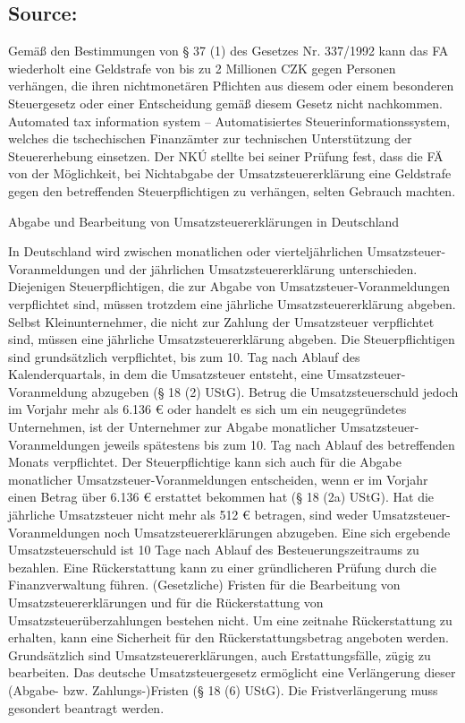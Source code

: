 \documentclass[10pt]{article}
\begin{document}
\subsection*{Source:}

Gemäß den Bestimmungen von § 37 (1) des Gesetzes Nr. 337/1992 kann das FA wiederholt eine Geldstrafe von bis zu 2 Millionen CZK gegen Personen verhängen, die ihren nichtmonetären Pﬂichten aus diesem oder einem besonderen Steuergesetz oder einer Entscheidung gemäß diesem Gesetz nicht nachkommen.
Automated tax information system – Automatisiertes Steuerinformationssystem, welches die tschechischen Finanzämter zur technischen Unterstützung der Steuererhebung einsetzen.
Der NKÚ stellte bei seiner Prüfung fest, dass die FÄ von der Möglichkeit, bei Nichtabgabe der Umsatzsteuererklärung eine Geldstrafe gegen den betreffenden Steuerpﬂichtigen zu verhängen, selten Gebrauch machten.


Abgabe und Bearbeitung von Umsatzsteuererklärungen in Deutschland

In Deutschland wird zwischen monatlichen oder vierteljährlichen Umsatzsteuer-Voranmeldungen und der jährlichen Umsatzsteuererklärung unterschieden.
Diejenigen Steuerpﬂichtigen, die zur Abgabe von Umsatzsteuer-Voranmeldungen verpﬂichtet sind, müssen trotzdem eine jährliche Umsatzsteuererklärung abgeben.
Selbst Kleinunternehmer, die nicht zur Zahlung der Umsatzsteuer verpﬂichtet sind, müssen eine jährliche Umsatzsteuererklärung abgeben.
Die Steuerpﬂichtigen sind grundsätzlich verpﬂichtet, bis zum 10. Tag nach Ablauf des Kalenderquartals, in dem die Umsatzsteuer entsteht, eine Umsatzsteuer-Voranmeldung abzugeben (§ 18 (2) UStG).
Betrug die Umsatzsteuerschuld jedoch im Vorjahr mehr als 6.136 € oder handelt es sich um ein neugegründetes Unternehmen, ist der Unternehmer zur Abgabe monatlicher Umsatzsteuer-Voranmeldungen jeweils spätestens bis zum 10. Tag nach Ablauf des betreffenden Monats verpﬂichtet.
Der Steuerpﬂichtige kann sich auch für die Abgabe monatlicher Umsatzsteuer-Voranmeldungen entscheiden, wenn er im Vorjahr einen Betrag über 6.136 € erstattet bekommen hat (§ 18 (2a) UStG).
Hat die jährliche Umsatzsteuer nicht mehr als 512 € betragen, sind weder Umsatzsteuer-Voranmeldungen noch Umsatzsteuererklärungen abzugeben.
Eine sich ergebende Umsatzsteuerschuld ist 10 Tage nach Ablauf des Besteuerungszeitraums zu bezahlen.
Eine Rückerstattung kann zu einer gründlicheren Prüfung durch die Finanzverwaltung führen.
(Gesetzliche) Fristen für die Bearbeitung von Umsatzsteuererklärungen und für die Rückerstattung von Umsatzsteuerüberzahlungen bestehen nicht.
Um eine zeitnahe Rückerstattung zu erhalten, kann eine Sicherheit für den Rückerstattungsbetrag angeboten werden.
Grundsätzlich sind Umsatzsteuererklärungen, auch Erstattungsfälle, zügig zu bearbeiten.
Das deutsche Umsatzsteuergesetz ermöglicht eine Verlängerung dieser (Abgabe- bzw. Zahlungs-)Fristen (§ 18 (6) UStG).
Die Fristverlängerung muss gesondert beantragt werden.
\end{document}
